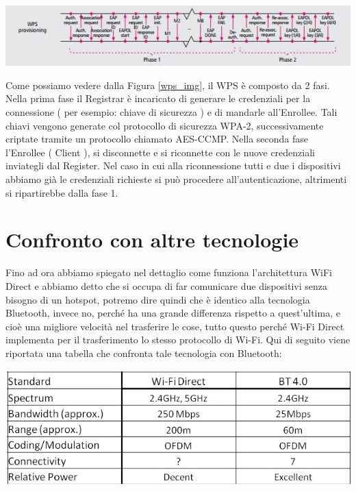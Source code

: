 \begin{center}
\includegraphics[width=1\textwidth]{imgs/WPS.jpg}
\label{wps_img}%
\end{center}

Come possiamo vedere dalla Figura \ref{wps_img}, il WPS è composto da 2 fasi.
Nella prima fase il Registrar è incaricato di generare le credenziali per la connessione (  per esempio: chiave di sicurezza ) e di mandarle all’Enrollee.
Tali chiavi vengono generate col protocollo di sicurezza WPA-2, successivamente criptate tramite un protocollo chiamato AES-CCMP.
Nella seconda fase l’Enrollee ( Client ), si disconnette e si riconnette con le nuove credenziali inviategli dal Register.
Nel caso in cui alla riconnessione tutti e due i dispositivi abbiamo già le credenziali richieste si può procedere all’autenticazione, altrimenti si ripartirebbe dalla fase 1.



\section{Confronto con altre tecnologie}

Fino ad ora abbiamo spiegato nel dettaglio come funziona l’architettura WiFi Direct e abbiamo detto che si occupa di far comunicare due dispositivi senza bisogno di un hotspot, potremo dire quindi che è identico alla tecnologia Bluetooth, invece no, perché ha una grande differenza rispetto a quest’ultima, e cioè una migliore velocità nel trasferire le cose, tutto questo perché Wi-Fi Direct implementa per il trasferimento lo stesso protocollo di Wi-Fi.
Qui di seguito viene riportata una tabella che confronta tale tecnologia con Bluetooth:

\begin{center}
\includegraphics[width=1\textwidth]{imgs/WvsB.jpg}
\label{WvsB_img}%
\end{center}

